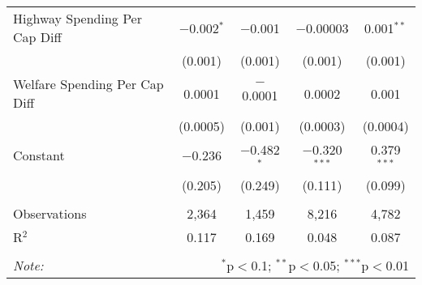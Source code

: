 \begin{table}[!htbp]
\begin{tabular}{@{\extracolsep{5pt}}lcccc}
  Highway Spending Per Cap Diff & $-$0.002$^{*}$ & $-$0.001 & $-$0.00003 & 0.001$^{**}$ \\ 
  & (0.001) & (0.001) & (0.001) & (0.001) \\ 
  Welfare Spending Per Cap Diff & 0.0001 & $-$0.0001 & 0.0002 & 0.001 \\ 
  & (0.0005) & (0.001) & (0.0003) & (0.0004) \\ 
  Constant & $-$0.236 & $-$0.482$^{*}$ & $-$0.320$^{***}$ & 0.379$^{***}$ \\ 
  & (0.205) & (0.249) & (0.111) & (0.099) \\ 
 \hline \\[-1.8ex] 
Observations & 2,364 & 1,459 & 8,216 & 4,782 \\ 
R$^{2}$ & 0.117 & 0.169 & 0.048 & 0.087 \\ 
\hline 
\hline \\[-1.8ex] 
\textit{Note:}  & \multicolumn{4}{r}{$^{*}$p$<$0.1; $^{**}$p$<$0.05; $^{***}$p$<$0.01} \\ 
\end{tabular} 
\end{table} 
